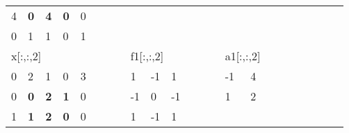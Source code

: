 \begin{table}[h]
\begin{tabular}{lllllllllllllllllllllll}
\multicolumn{1}{|l|}{4} & \multicolumn{1}{l|}{\textbf{0}} & \multicolumn{1}{l|}{\textbf{4}} & \multicolumn{1}{l|}{\textbf{0}} & \multicolumn{1}{l|}{0} &  &  &                       &                         & \textbf{}               & \textbf{}               &  &  &                       &                         &                        &  &  &                       &                        &                         &  &  \\ \cline{1-5}
\multicolumn{1}{|l|}{0} & \multicolumn{1}{l|}{1}          & \multicolumn{1}{l|}{1}          & \multicolumn{1}{l|}{0}          & \multicolumn{1}{l|}{1} &  &  &                       &                         &                         &                         &  &  &                       &                         &                        &  &  &                       &                        &                         &  &  \\ \cline{1-5}
\multicolumn{5}{l}{x{[}:,:,2{]}}                                                                                                                       &  &  &                       & \multicolumn{3}{l}{f1{[}:,:,2{]}}                                           &  &  &                       & \multicolumn{2}{l}{a1{[}:,:,2{]}}                &  &  &                       &                        &                         &  &  \\ \cline{1-5} \cline{9-11} \cline{15-16}
\multicolumn{1}{|l|}{0} & \multicolumn{1}{l|}{2}          & \multicolumn{1}{l|}{1}          & \multicolumn{1}{l|}{0}          & \multicolumn{1}{l|}{3} &  &  & \multicolumn{1}{l|}{} & \multicolumn{1}{l|}{1}  & \multicolumn{1}{l|}{-1} & \multicolumn{1}{l|}{1}  &  &  & \multicolumn{1}{l|}{} & \multicolumn{1}{l|}{-1} & \multicolumn{1}{l|}{4} &  &  &                       &                        &                         &  &  \\ \cline{1-5} \cline{9-11} \cline{15-16}
\multicolumn{1}{|l|}{0} & \multicolumn{1}{l|}{\textbf{0}} & \multicolumn{1}{l|}{\textbf{2}} & \multicolumn{1}{l|}{\textbf{1}} & \multicolumn{1}{l|}{0} &  &  & \multicolumn{1}{l|}{} & \multicolumn{1}{l|}{-1} & \multicolumn{1}{l|}{0}  & \multicolumn{1}{l|}{-1} &  &  & \multicolumn{1}{l|}{} & \multicolumn{1}{l|}{1}  & \multicolumn{1}{l|}{2} &  &  &                       &                        &                         &  &  \\ \cline{1-5} \cline{9-11} \cline{15-16}
\multicolumn{1}{|l|}{1} & \multicolumn{1}{l|}{\textbf{1}} & \multicolumn{1}{l|}{\textbf{2}} & \multicolumn{1}{l|}{\textbf{0}} & \multicolumn{1}{l|}{0} &  &  & \multicolumn{1}{l|}{} & \multicolumn{1}{l|}{1}  & \multicolumn{1}{l|}{-1} & \multicolumn{1}{l|}{1}  &  &  &                       &                         &                        &  &  &                       &                        &                         &  &  \\ \cline{1-5} \cline{9-11}

\end{tabular}
\end{table}

